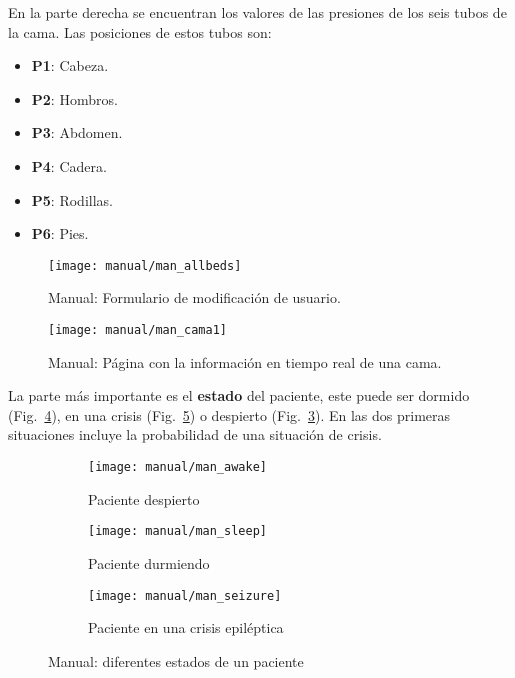 En la parte derecha se encuentran los valores de las presiones de los seis tubos de la cama. Las posiciones de estos tubos son:
\begin{itemize}
	\item \textbf{P1}: Cabeza.
	\item \textbf{P2}: Hombros.
	\item \textbf{P3}: Abdomen.
	\item \textbf{P4}: Cadera.
	\item \textbf{P5}: Rodillas.
	\item \textbf{P6}: Pies.
\end{itemize}

\begin{figure}
	\centering
	\texttt{[image: manual/man\_allbeds]}
	\caption{Manual: Formulario de modificación de usuario.}
	\label{fig:man_bedlist}
\end{figure}

\begin{figure}
	\centering
	\texttt{[image: manual/man\_cama1]}
	\caption{Manual: Página con la información en tiempo real de una cama.}
	\label{fig:man_bed}
\end{figure}

La parte más importante es el \textbf{estado} del paciente, este puede ser dormido (Fig.~\ref{fig:man_dormido}), en una crisis (Fig.~\ref{fig:man_crisis}) o despierto (Fig.~\ref{fig:man_despiertos}). En las dos primeras situaciones incluye la probabilidad de una situación de crisis.

\begin{figure}
	\centering
	\begin{subfigure}[b]{0.48\textwidth}
		\centering
		\texttt{[image: manual/man\_awake]}
		\caption{Paciente despierto}
		\label{fig:man_despiertos}
	\end{subfigure}
	\begin{subfigure}[b]{1\textwidth}
		\centering
		\texttt{[image: manual/man\_sleep]}
		\caption{Paciente durmiendo}
		\label{fig:man_dormido}
	\end{subfigure}
	\begin{subfigure}[b]{0.9\textwidth}
		\centering
		\texttt{[image: manual/man\_seizure]}
		\caption{Paciente en una crisis epiléptica}
		\label{fig:man_crisis}
	\end{subfigure}
	\caption{Manual: diferentes estados de un paciente}
	\label{fig:man_states}
\end{figure}

